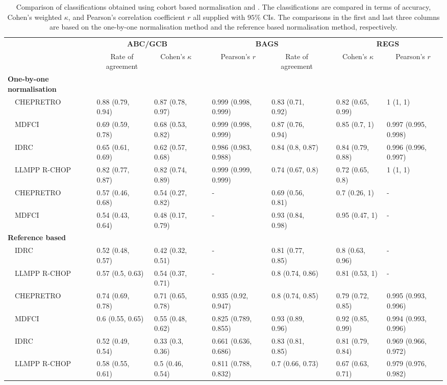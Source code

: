 \begin{table}[!tbp]
{\scriptsize
\caption{Comparison of classifications obtained using cohort based
normalisation and \hemaClass{}.
The classifications are compared in terms of accuracy, Cohen's weighted
$\kappa$, and Pearson's correlation coefficient $r$ all supplied with $95\%$
CIs. The comparisons in the first and last three columns are based on the
one-by-one normalisation method and the reference based normalisation method,
respectively.\label{tab:classALL}} 
\begin{center}
\begin{tabular}{lllcllcll}
\hline\hline
\multicolumn{1}{l}{\bfseries }&\multicolumn{2}{c}{\bfseries ABC/GCB}&\multicolumn{1}{c}{\bfseries }&\multicolumn{2}{c}{\bfseries BAGS}&\multicolumn{1}{c}{\bfseries }&\multicolumn{2}{c}{\bfseries REGS}\tabularnewline
\cline{2-3} \cline{5-6} \cline{8-9}
\multicolumn{1}{l}{}&\multicolumn{1}{c}{Rate of agreement}&\multicolumn{1}{c}{Cohen's $\kappa$}&\multicolumn{1}{c}{}&\multicolumn{1}{c}{Pearson's $r$}&\multicolumn{1}{c}{Rate of agreement}&\multicolumn{1}{c}{}&\multicolumn{1}{c}{Cohen's $\kappa$}&\multicolumn{1}{c}{Pearson's $r$}\tabularnewline
\hline
{\bfseries One-by-one normalisation}&&&&&&&&\tabularnewline
~~CHEPRETRO&0.88 (0.79, 0.94)&0.87 (0.78, 0.97)&&0.999 (0.998, 0.999)&0.83 (0.71, 0.92)&&0.82 (0.65, 0.99)&1 (1, 1)\tabularnewline
~~MDFCI&0.69 (0.59, 0.78)&0.68 (0.53, 0.82)&&0.999 (0.998, 0.999)&0.87 (0.76, 0.94)&&0.85 (0.7, 1)&0.997 (0.995, 0.998)\tabularnewline
~~IDRC&0.65 (0.61, 0.69)&0.62 (0.57, 0.68)&&0.986 (0.983, 0.988)&0.84 (0.8, 0.87)&&0.84 (0.79, 0.88)&0.996 (0.996, 0.997)\tabularnewline
~~LLMPP R-CHOP&0.82 (0.77, 0.87)&0.82 (0.74, 0.89)&&0.999 (0.999, 0.999)&0.74 (0.67, 0.8)&&0.72 (0.65, 0.8)&1 (1, 1)\tabularnewline
~~CHEPRETRO&0.57 (0.46, 0.68)&0.54 (0.27, 0.82)&&-&0.69 (0.56, 0.81)&&0.7 (0.26, 1)&-\tabularnewline
~~MDFCI&0.54 (0.43, 0.64)&0.48 (0.17, 0.79)&&-&0.93 (0.84, 0.98)&&0.95 (0.47, 1)&-\tabularnewline
\hline
{\bfseries Reference based}&&&&&&&&\tabularnewline
~~IDRC&0.52 (0.48, 0.57)&0.42 (0.32, 0.51)&&-&0.81 (0.77, 0.85)&&0.8 (0.63, 0.96)&-\tabularnewline
~~LLMPP R-CHOP&0.57 (0.5, 0.63)&0.54 (0.37, 0.71)&&-&0.8 (0.74, 0.86)&&0.81 (0.53, 1)&-\tabularnewline
~~CHEPRETRO&0.74 (0.69, 0.78)&0.71 (0.65, 0.78)&&0.935 (0.92, 0.947)&0.8 (0.74, 0.85)&&0.79 (0.72, 0.85)&0.995 (0.993, 0.996)\tabularnewline
~~MDFCI&0.6 (0.55, 0.65)&0.55 (0.48, 0.62)&&0.825 (0.789, 0.855)&0.93 (0.89, 0.96)&&0.92 (0.85, 0.99)&0.994 (0.993, 0.996)\tabularnewline
~~IDRC&0.52 (0.49, 0.54)&0.33 (0.3, 0.36)&&0.661 (0.636, 0.686)&0.83 (0.81, 0.85)&&0.81 (0.79, 0.84)&0.969 (0.966, 0.972)\tabularnewline
~~LLMPP R-CHOP&0.58 (0.55, 0.61)&0.5 (0.46, 0.54)&&0.811 (0.788, 0.832)&0.7 (0.66, 0.73)&&0.67 (0.63, 0.71)&0.979 (0.976, 0.982)\tabularnewline
\hline
\end{tabular}\end{center}}

\end{table}
